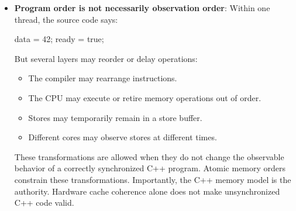 \documentclass{report}
\begin{document}
\begin{itemize}
\begin{cppcode}
                void producer() {
                    data = 42;
                    ready.store(true);
                }

                void consumer() {
                    while (!ready.load()) { }

                    std::cout << data << '\n';
                }
            \end{cppcode}
            \bigbreak \noindent 
            The intent is:
            \begin{itemize}
                \item Producer writes data.
                \item Producer sets ready.
                \item Consumer observes ready.
                \item Consumer reads data.
            \end{itemize}
            For this to work, the atomic flag must do more than safely transfer a Boolean value. It must also ensure that the write to data becomes visible before the consumer reads it. Memory ordering defines that relationship.
        \item \textbf{Program order is not necessarily observation order}: Within one thread, the source code says:
            \bigbreak \noindent 
            \begin{cppcode}
                data = 42;
                ready = true;
            \end{cppcode}
            \bigbreak \noindent 
            But several layers may reorder or delay operations:
            \begin{itemize}
                \item The compiler may rearrange instructions.
                \item The CPU may execute or retire memory operations out of order.
                \item Stores may temporarily remain in a store buffer.
                \item Different cores may observe stores at different times.
            \end{itemize}
            These transformations are allowed when they do not change the observable behavior of a correctly synchronized C++ program.
            \bigbreak \noindent 
            Atomic memory orders constrain these transformations.
            \bigbreak \noindent 
            Importantly, the C++ memory model is the authority. Hardware cache coherence alone does not make unsynchronized C++ code valid.

\end{itemize}
\end{document}
